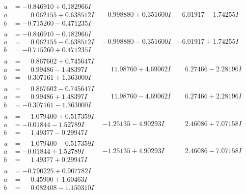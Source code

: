 \documentclass[1p]{elsarticle_modified}
\theoremstyle{definition}
\begin{document}
$$\begin{array}{c|c|c}
\begin{aligned}
u &= -0.846910 + 0.182966 I \\
a &= \phantom{-}0.062155 + 0.638512 I \\
b &= -0.715260 - 0.471235 I\end{aligned}
 & -0.998880 + 0.351600 I & -6.01917 - 1.74255 I \\ \hline\begin{aligned}
u &= -0.846910 - 0.182966 I \\
a &= \phantom{-}0.062155 - 0.638512 I \\
b &= -0.715260 + 0.471235 I\end{aligned}
 & -0.998880 - 0.351600 I & -6.01917 + 1.74255 I \\ \hline\begin{aligned}
u &= \phantom{-}0.867602 + 0.745647 I \\
a &= \phantom{-}0.99486 - 1.48397 I \\
b &= -0.307161 + 1.363000 I\end{aligned}
 & \phantom{-}11.98760 + 4.69062 I & \phantom{-}6.27466 - 2.28196 I \\ \hline\begin{aligned}
u &= \phantom{-}0.867602 - 0.745647 I \\
a &= \phantom{-}0.99486 + 1.48397 I \\
b &= -0.307161 - 1.363000 I\end{aligned}
 & \phantom{-}11.98760 - 4.69062 I & \phantom{-}6.27466 + 2.28196 I \\ \hline\begin{aligned}
u &= \phantom{-}1.079400 + 0.517359 I \\
a &= -0.01844 - 1.52789 I \\
b &= \phantom{-}1.49377 - 0.29947 I\end{aligned}
 & -1.25135 - 4.90293 I & \phantom{-}2.46086 + 7.07158 I \\ \hline\begin{aligned}
u &= \phantom{-}1.079400 - 0.517359 I \\
a &= -0.01844 + 1.52789 I \\
b &= \phantom{-}1.49377 + 0.29947 I\end{aligned}
 & -1.25135 + 4.90293 I & \phantom{-}2.46086 - 7.07158 I \\ \hline\begin{aligned}
u &= -0.790225 + 0.907782 I \\
a &= \phantom{-}0.45900 + 1.60463 I \\
b &= \phantom{-}0.082408 - 1.150310 I\end{aligned}

\end{array}$$
\end{document}
